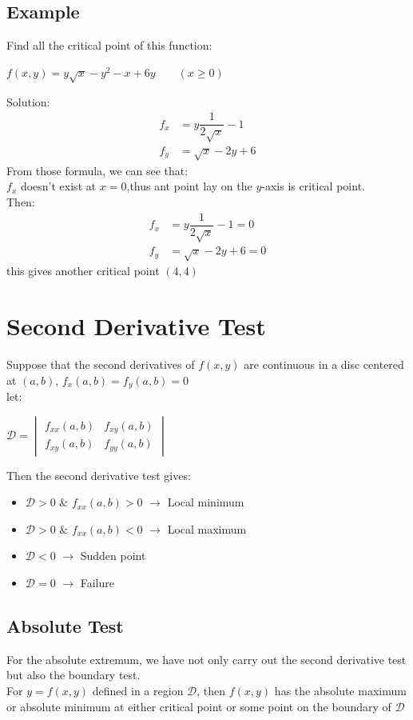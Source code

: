 \documentclass[UTF8,a4paper, 10pt, openany]{book}
\begin{document}
\subsection{Example}
Find all the critical point of this function:
\begin{center}
$f(x,y)=y\sqrt{x}-y^2-x+6y\qquad (x\geq 0)$
\end{center}
Solution:\\
\begin{align*}
f_x &=y\dfrac{1}{2\sqrt{x}}-1\\
f_y &=\sqrt{x}-2y+6
\end{align*}
From those formula, we can see that:\\
$f_x$ doesn't exist at $x=0$,thus ant point lay on the $y$-axis is critical point.\\
Then:
\begin{align*}
f_x &=y\dfrac{1}{2\sqrt{x}}-1=0\\
f_y &=\sqrt{x}-2y+6=0
\end{align*}
this gives another critical point $(4,4)$
\section{Second Derivative Test}
Suppose that the second derivatives of $f(x,y)$ are continuous in a disc centered at $(a,b)$, $f_x(a,b)=f_y(a,b)=0$\\
let:
\begin{center}
$\boxed{\mathcal{D}=
\begin{vmatrix}
f_{xx}(a,b) & f_{xy}(a,b)\\
f_{xy}(a,b) & f_{yy}(a,b)
\end{vmatrix}
}$
\end{center}
Then the second derivative test gives:
\begin{itemize}
\item $\mathcal{D}>0$ $\&$ $f_{xx}(a,b)>0$ $\rightarrow$ Local minimum\\
\item $\mathcal{D}>0$ $\&$ $f_{xx}(a,b)<0$ $\rightarrow$ Local maximum\\
\item $\mathcal{D}<0$ $\rightarrow$ Sudden point \\
\item $\mathcal{D}=0$ $\rightarrow$ Failure
\end{itemize}
\subsection{Absolute Test}
For the absolute extremum, we have not only carry out the second derivative test but also the boundary test.\\
For $y=f(x,y)$ defined in a region $\mathcal{D}$, then $f(x,y)$ has the absolute maximum or absolute minimum at either critical point or some point on the boundary of $\mathcal{D}$
\end{document}
